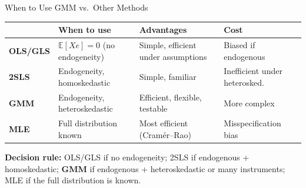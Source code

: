 \documentclass[aspectratio=169, handout]{beamer}
\numberwithin{equation}{section}
\begin{document}
\begin{frame}{When to Use GMM vs.\ Other Methods}

\begin{table}[h]
\centering
\small
\begin{tabular}{p{1.5cm}p{3.8cm}p{3.8cm}p{2.8cm}}
\toprule
& \textbf{When to use} & \textbf{Advantages} & \textbf{Cost} \\
\midrule
\textbf{OLS/GLS} & $\mathbb{E}[Xe]\!=\!0$ (no endogeneity) & Simple, efficient under assumptions & Biased if endogenous \\
\textbf{2SLS} & Endogeneity, homoskedastic & Simple, familiar & Inefficient under heterosked. \\
\textbf{GMM} & Endogeneity, heteroskedastic & Efficient, flexible, testable & More complex \\
\textbf{MLE} & Full distribution known & Most efficient (Cram\'er--Rao) & Misspecification bias \\
\bottomrule
\end{tabular}
\end{table}

\textbf{Decision rule:} OLS/GLS if no endogeneity; 2SLS if endogenous + homoskedastic; \textbf{GMM} if endogenous + heteroskedastic or many instruments; MLE if the full distribution is known.

\end{frame}
\end{document}
